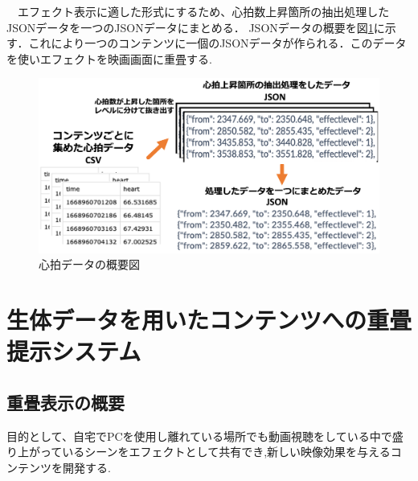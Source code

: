 　エフェクト表示に適した形式にするため、心拍数上昇箇所の抽出処理したJSONデータを一つのJSONデータにまとめる．
JSONデータの概要を図\ref{gaiyou}に示す．これにより一つのコンテンツに一個のJSONデータが作られる．このデータを使いエフェクトを映画画面に重畳する.

\begin{figure}[H]
    \centering
    \includegraphics[width=16cm]{images/chapter3/system.png}
    \caption{心拍データの概要図}
    \label{gaiyou}
\end{figure}







\section{生体データを用いたコンテンツへの重畳提示システム}
\subsection{重畳表示の概要}
目的として、自宅でPCを使用し離れている場所でも動画視聴をしている中で盛り上がっているシーンをエフェクトとして共有でき,新しい映像効果を与えるコンテンツを開発する.


